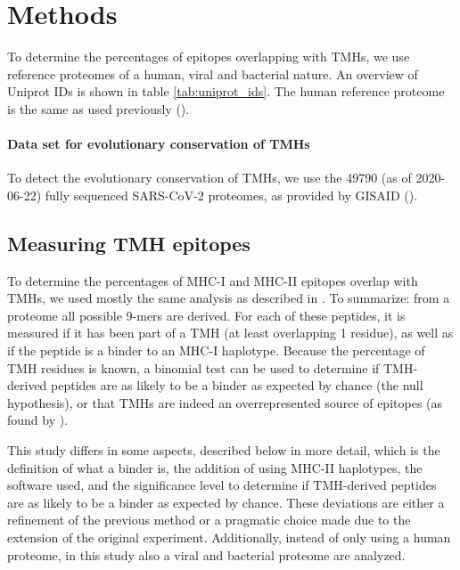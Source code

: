 \section{Methods}


To determine the percentages of epitopes overlapping
with TMHs, we use reference proteomes of 
a human, viral and bacterial nature.
An overview of Uniprot IDs is shown in table \ref{tab:uniprot_ids}.
The human reference proteome is the same as used previously (\cite{bianchi2017}).

\paragraph{Data set for evolutionary conservation of TMHs}

To detect the evolutionary conservation of TMHs,
we use the 49790 (as of 2020-06-22) fully sequenced SARS-CoV-2 proteomes, 
as provided by GISAID (\cite{shu2017gisaid}).

\subsection{Measuring TMH epitopes}

To determine the percentages of MHC-I and MHC-II epitopes overlap
with TMHs, we used mostly the same analysis as described in \cite{bianchi2017}.
To summarize: from a proteome all possible 9-mers are derived. For each
of these peptides, it is measured if it has been part of a 
TMH (at least overlapping 1 residue), 
as well as if the peptide is a binder to an MHC-I haplotype.
Because the percentage of TMH residues is known, a binomial test can be
used to determine if TMH-derived peptides are as likely to be a binder
as expected by chance (the null hypothesis), or that TMHs are indeed an
overrepresented source of epitopes (as found by \cite{bianchi2017}).

This study differs in some aspects, described below in more detail,
which is the definition of what a binder is,
the addition of using MHC-II haplotypes, the software used,
and the significance level to determine if TMH-derived peptides are as 
likely to be a binder as expected by chance.
These deviations are either a refinement of the previous method or
a pragmatic choice made due to the extension of the original experiment.
Additionally, instead of only using a human proteome, in this study
also a viral and bacterial proteome are analyzed.

